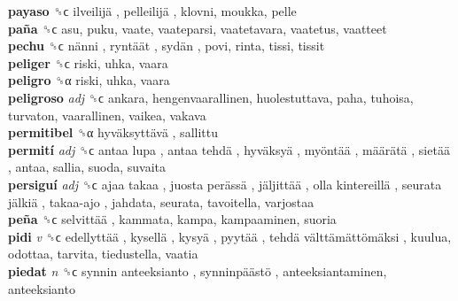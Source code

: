 \textbf{payaso} ␝ϲ   ilveilijä ,  pelleilijä , klovni, moukka, pelle  \\
\textbf{paña} ␝ϲ  asu, puku, vaate, vaateparsi, vaatetavara, vaatetus, vaatteet  \\
\textbf{pechu} ␝ϲ   nänni ,  ryntäät ,  sydän , povi, rinta, tissi, tissit  \\
\textbf{peliger} ␝ϲ  riski, uhka, vaara  \\
\textbf{peligro} ␝α  riski, uhka, vaara  \\
\textbf{peligroso} \emph{adj}  ␝ϲ  ankara, hengenvaarallinen, huolestuttava, paha, tuhoisa, turvaton, vaarallinen, vaikea, vakava  \\
\textbf{permitibel} ␝α   hyväksyttävä , sallittu  \\
\textbf{permití} \emph{adj}  ␝ϲ   antaa lupa ,  antaa tehdä ,  hyväksyä ,  myöntää ,  määrätä ,  sietää , antaa, sallia, suoda, suvaita  \\
\textbf{persiguí} \emph{adj}  ␝ϲ   ajaa takaa ,  juosta perässä ,  jäljittää ,  olla kintereillä ,  seurata jälkiä ,  takaa-ajo , jahdata, seurata, tavoitella, varjostaa  \\
\textbf{peña} ␝ϲ   selvittää , kammata, kampa, kampaaminen, suoria  \\
\textbf{pidi} \emph{v}  ␝ϲ   edellyttää ,  kysellä ,  kysyä ,  pyytää ,  tehdä välttämättömäksi , kuulua, odottaa, tarvita, tiedustella, vaatia  \\
\textbf{piedat} \emph{n}  ␝ϲ   synnin anteeksianto ,  synninpäästö , anteeksiantaminen, anteeksianto  \\

